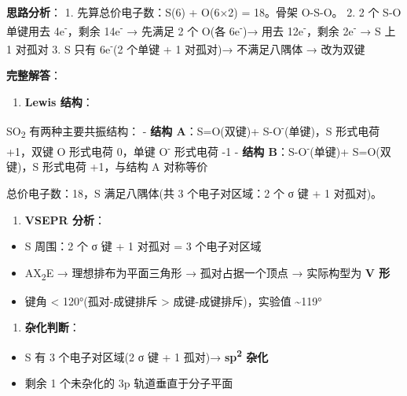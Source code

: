 \textbf{思路分析}：
1. 先算总价电子数：S(6) + O(6×2) = 18。骨架 O-S-O。
2. 2 个 S-O 单键用去 4e\textsuperscript{-}，剩余 14e\textsuperscript{-} → 先满足 2 个 O(各 6e\textsuperscript{-})→ 用去 12e\textsuperscript{-}，剩余 2e\textsuperscript{-} → S 上 1 对孤对
3. S 只有 6e\textsuperscript{-}(2 个单键 + 1 对孤对)→ 不满足八隅体 → 改为双键

\textbf{完整解答}：

\begin{enumerate}
\def\labelenumi{(\arabic{enumi})}
\tightlist
\item
  \textbf{Lewis 结构}：
\end{enumerate}

SO\textsubscript{2} 有两种主要共振结构：
- \textbf{结构 A}：S=O(双键)+ S-O\textsuperscript{-}(单键)，S 形式电荷 +1，双键 O 形式电荷 0，单键 O\textsuperscript{-} 形式电荷 -1
- \textbf{结构 B}：S-O\textsuperscript{-}(单键)+ S=O(双键)，S 形式电荷 +1，与结构 A 对称等价

总价电子数：18，S 满足八隅体(共 3 个电子对区域：2 个 σ 键 + 1 对孤对)。

\begin{enumerate}
\def\labelenumi{(\arabic{enumi})}
\setcounter{enumi}{1}
\tightlist
\item
  \textbf{VSEPR 分析}：
\end{enumerate}

\begin{itemize}
\tightlist
\item
  S 周围：2 个 σ 键 + 1 对孤对 = 3 个电子对区域
\item
  AX\textsubscript{2}E → 理想排布为平面三角形 → 孤对占据一个顶点 → 实际构型为 \textbf{V 形}
\item
  键角 \textless{} 120°(孤对-成键排斥 \textgreater{} 成键-成键排斥)，实验值 \textasciitilde119°
\end{itemize}

\begin{enumerate}
\def\labelenumi{(\arabic{enumi})}
\setcounter{enumi}{2}
\tightlist
\item
  \textbf{杂化判断}：
\end{enumerate}

\begin{itemize}
\tightlist
\item
  S 有 3 个电子对区域(2 σ 键 + 1 孤对)→ \textbf{sp\textsuperscript{2} 杂化}
\item
  剩余 1 个未杂化的 3p 轨道垂直于分子平面
\end{itemize}

